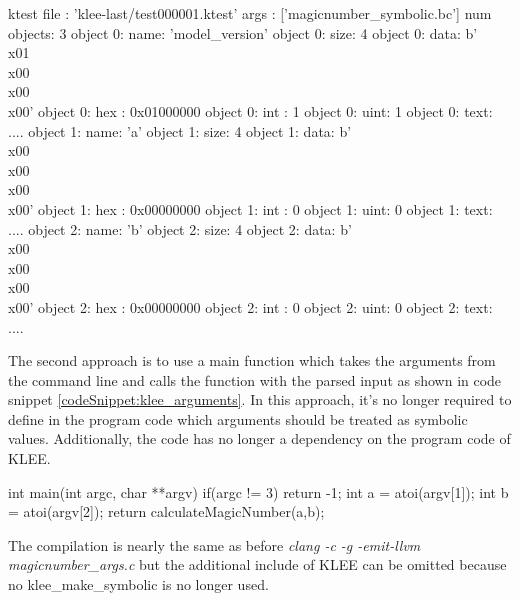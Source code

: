 \begin{customlisting}[caption={The test case generated by KLEE which triggers the assertion error when executing it on the code snippet \ref{codeSnippet:klee_inline}}, label={listing:test_case_one}]
ktest file : 'klee-last/test000001.ktest'
args       : ['magicnumber_symbolic.bc']
num objects: 3
object 0: name: 'model_version'
object 0: size: 4
object 0: data: b'\\x01\\x00\\x00\\x00'
object 0: hex : 0x01000000
object 0: int : 1
object 0: uint: 1
object 0: text: ....
object 1: name: 'a'
object 1: size: 4
object 1: data: b'\\x00\\x00\\x00\\x00'
object 1: hex : 0x00000000
object 1: int : 0
object 1: uint: 0
object 1: text: ....
object 2: name: 'b'
object 2: size: 4
object 2: data: b'\\x00\\x00\\x00\\x00'
object 2: hex : 0x00000000
object 2: int : 0
object 2: uint: 0
object 2: text: ....
\end{customlisting}

The second approach is to use a main function which takes the arguments from the command line and calls the function with the parsed input as shown in code snippet \ref{codeSnippet:klee_arguments}.
In this approach, it's no longer required to define in the program code which arguments should be treated as symbolic values. Additionally, the code has no longer a dependency on the program code of KLEE.

\begin{codesnippet}[caption={Main function which parses two input arguments and calls the function calculateMagicNumber of code snippet \ref{codeSnippet:symbolicExecution}}, label={codeSnippet:klee_arguments}]
int main(int argc, char **argv) {
  if(argc != 3){
	return -1;
  }
  int a = atoi(argv[1]);
  int b = atoi(argv[2]);
  return calculateMagicNumber(a,b);
}
\end{codesnippet}

The compilation is nearly the same as before \textit{clang -c -g -emit-llvm magicnumber\_args.c} but the additional include of KLEE can be omitted because no klee\_make\_symbolic is no longer used.

